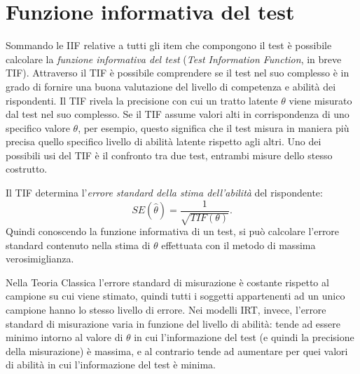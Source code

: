 \section{Funzione informativa del test}

Sommando le IIF relative a tutti gli item che compongono il test è possibile calcolare la \emph{funzione informativa del test} (\emph{Test Information Function}, in breve TIF). Attraverso il TIF è possibile comprendere se il test nel suo  complesso è in grado di fornire  una buona valutazione del livello di competenza e abilità dei rispondenti.
Il TIF rivela la precisione con cui un tratto latente $\theta$ viene misurato dal test nel suo complesso. Se il TIF assume valori alti in corrispondenza di uno specifico valore $\theta$, per esempio, questo significa che il test misura in maniera più precisa quello specifico livello di abilità latente rispetto agli altri. Uno dei possibili usi del TIF è il confronto tra due test, entrambi misure dello stesso costrutto. 

Il TIF determina l'\emph{errore standard della stima dell'abilità} del rispondente:
\begin{equation}
SE(\hat{\theta}) = \frac{1}{\sqrt{TIF(\theta)}}.
\label{tot.info}
\end{equation}
Quindi conoscendo la funzione informativa di un test, si può calcolare l'errore standard contenuto nella stima di $\theta$ effettuata con il metodo di massima verosimiglianza.

Nella Teoria Classica l'errore standard di misurazione è costante rispetto al campione su cui viene stimato, quindi tutti i soggetti appartenenti ad un unico campione hanno lo stesso livello di errore. Nei modelli IRT, invece, l'errore standard di misurazione varia in funzione del livello di abilità: tende ad essere minimo intorno al valore di $\theta$ in cui l'informazione del test (e quindi la precisione della misurazione) è massima, e al contrario tende ad aumentare per quei valori di abilità in cui l'informazione del test è minima. 

